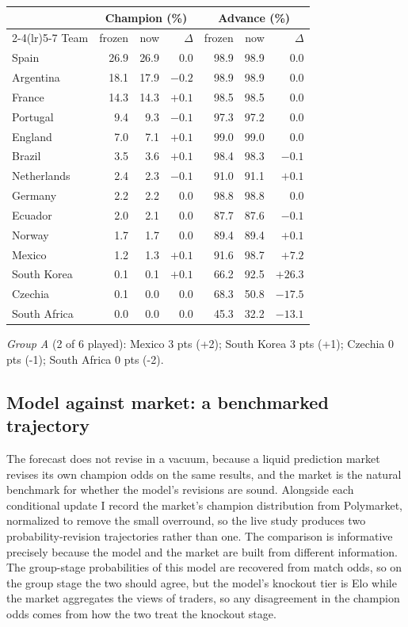 \documentclass[11pt,letterpaper]{article}
\begin{document}
\begin{longtable}{lrrrrrr}
\toprule
 & \multicolumn{3}{c}{Champion (\%)} & \multicolumn{3}{c}{Advance (\%)} \\
\cmidrule(lr){2-4}\cmidrule(lr){5-7}
Team & frozen & now & $\Delta$ & frozen & now & $\Delta$ \\
\midrule
\endhead
Spain & 26.9 & 26.9 & 0.0 & 98.9 & 98.9 & 0.0 \\
Argentina & 18.1 & 17.9 & $-0.2$ & 98.9 & 98.9 & 0.0 \\
France & 14.3 & 14.3 & $+0.1$ & 98.5 & 98.5 & 0.0 \\
Portugal & 9.4 & 9.3 & $-0.1$ & 97.3 & 97.2 & 0.0 \\
England & 7.0 & 7.1 & $+0.1$ & 99.0 & 99.0 & 0.0 \\
Brazil & 3.5 & 3.6 & $+0.1$ & 98.4 & 98.3 & $-0.1$ \\
Netherlands & 2.4 & 2.3 & $-0.1$ & 91.0 & 91.1 & $+0.1$ \\
Germany & 2.2 & 2.2 & 0.0 & 98.8 & 98.8 & 0.0 \\
Ecuador & 2.0 & 2.1 & 0.0 & 87.7 & 87.6 & $-0.1$ \\
Norway & 1.7 & 1.7 & 0.0 & 89.4 & 89.4 & $+0.1$ \\
Mexico & 1.2 & 1.3 & $+0.1$ & 91.6 & 98.7 & $+7.2$ \\
South Korea & 0.1 & 0.1 & $+0.1$ & 66.2 & 92.5 & $+26.3$ \\
Czechia & 0.1 & 0.0 & 0.0 & 68.3 & 50.8 & $-17.5$ \\
South Africa & 0.0 & 0.0 & 0.0 & 45.3 & 32.2 & $-13.1$ \\
\bottomrule
\end{longtable}

\textit{Group A} (2 of 6 played): Mexico 3 pts (+2); South Korea 3 pts (+1); Czechia 0 pts (-1); South Africa 0 pts (-2).

\subsection{Model against market: a benchmarked trajectory}\label{sec:market}

The forecast does not revise in a vacuum, because a liquid prediction market revises its own champion odds on the same results, and the market is the natural benchmark for whether the model's revisions are sound. Alongside each conditional update I record the market's champion distribution from Polymarket, normalized to remove the small overround, so the live study produces two probability-revision trajectories rather than one. The comparison is informative precisely because the model and the market are built from different information. The group-stage probabilities of this model are recovered from match odds, so on the group stage the two should agree, but the model's knockout tier is Elo while the market aggregates the views of traders, so any disagreement in the champion odds comes from how the two treat the knockout stage.
\end{document}
